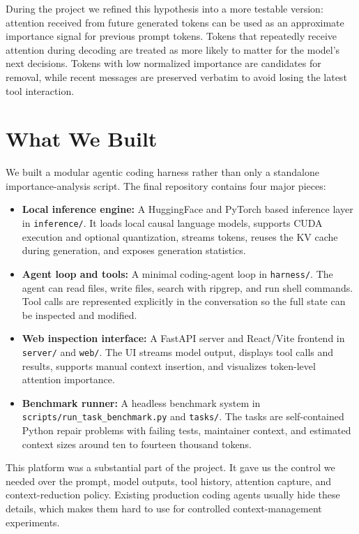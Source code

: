 \documentclass[11pt]{article}
\begin{document}
During the project we refined this hypothesis into a more testable version:
attention received from future generated tokens can be used as an approximate
importance signal for previous prompt tokens. Tokens that repeatedly receive
attention during decoding are treated as more likely to matter for the model's
next decisions. Tokens with low normalized importance are candidates for
removal, while recent messages are preserved verbatim to avoid losing the latest
tool interaction.

\section*{What We Built}

We built a modular agentic coding harness rather than only a standalone
importance-analysis script. The final repository contains four major pieces:

\begin{itemize}
    \item \textbf{Local inference engine:} A HuggingFace and PyTorch based
    inference layer in \texttt{inference/}. It loads local causal language
    models, supports CUDA execution and optional quantization, streams tokens,
    reuses the KV cache during generation, and exposes generation statistics.

    \item \textbf{Agent loop and tools:} A minimal coding-agent loop in
    \texttt{harness/}. The agent can read files, write files, search with
    ripgrep, and run shell commands. Tool calls are represented explicitly in
    the conversation so the full state can be inspected and modified.

    \item \textbf{Web inspection interface:} A FastAPI server and React/Vite
    frontend in \texttt{server/} and \texttt{web/}. The UI streams model output,
    displays tool calls and results, supports manual context insertion, and
    visualizes token-level attention importance.

    \item \textbf{Benchmark runner:} A headless benchmark system in
    \texttt{scripts/run\_task\_benchmark.py} and \texttt{tasks/}. The tasks are
    self-contained Python repair problems with failing tests, maintainer context,
    and estimated context sizes around ten to fourteen thousand tokens.
\end{itemize}

This platform was a substantial part of the project. It gave us the control we
needed over the prompt, model outputs, tool history, attention capture, and
context-reduction policy. Existing production coding agents usually hide these
details, which makes them hard to use for controlled context-management
experiments.
\end{document}
